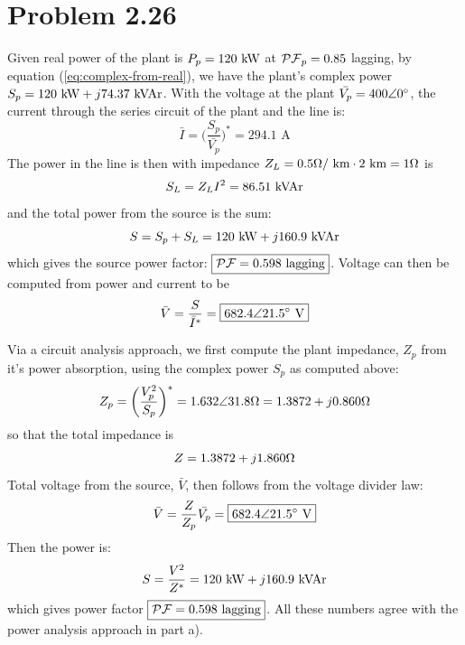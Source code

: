 \documentclass{homework}
\begin{document}
\section{Problem 2.26}
\begin{letterenum}
\item Given real power of the plant is $P_p = 120 \text{ kW}$ at $\mathcal{PF}_p= 0.85$
lagging, by equation (\ref{eq:complex-from-real}), we have the plant's
complex power $S_p = 120 \text{ kW} + j74.37 \text{ kVAr}$. With the voltage
at the plant $\bar{V_p} = 400 \angle 0 \degree$, the current
through the series circuit of the plant and the line is:
\begin{equation*}
    \bar{I} = \biggl(\frac{S_p}{\bar{V_p}}\biggr)^* = 294.1 \text{ A}
\end{equation*}
The power in the line is then with impedance
$Z_L = 0.5 \ohm/\text{ km} \cdot 2 \text{ km} = 1 \ohm$ is
\begin{equation*}
    S_L = Z_L I^2 = 86.51 \text{ kVAr}
\end{equation*}
and the total power from the source is the sum:
\begin{equation*}
    S = S_p + S_L = 120 \text{ kW} + j 160.9 \text{ kVAr}
\end{equation*}
which gives the source power factor: $\boxed{\mathcal{PF} = 0.598$ lagging$}$.
Voltage can then be computed from power and current to be
\begin{equation*}
    \bar{V} = \frac{S}{\bar{I}^*} = \boxed{682.4 \angle 21.5 \degree \text{ V}}
\end{equation*}

\item Via a circuit analysis approach, we first compute the 
plant impedance, $Z_p$ from it's power absorption, using
the complex power $S_p$ as computed above:
\begin{equation*}
    Z_p = \biggl(\frac{V_p^2}{S_p}\biggr)^* = 1.632 \angle 31.8 \ohm
        = 1.3872 + j0.860 \ohm
\end{equation*}
so that the total impedance is
\begin{equation*}
    Z = 1.3872 + j1.860 \ohm
\end{equation*}
Total voltage from the source, $\bar{V}$, then follows from the voltage
divider law:
\begin{equation*}
    \bar{V} = \frac{Z}{Z_p} \bar{V_p} = \boxed{682.4 \angle 21.5 \degree \text{ V}}
\end{equation*}
Then the power is:
\begin{equation*}
    S = \frac{V^2}{Z^*} = 120 \text{ kW} + j160.9 \text{ kVAr}
\end{equation*}
which gives power factor $\boxed{\mathcal{PF} = 0.598$ lagging$}$. All these numbers
agree with the power analysis approach in part a).

\end{letterenum}
\end{document}
